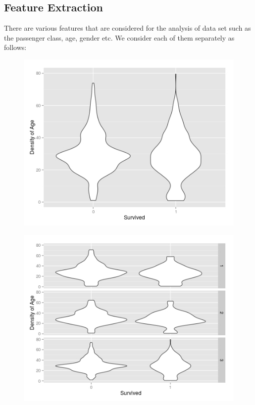 \subsection{Feature Extraction}
There are various features that are considered for the analysis of data set such as the passenger class, age, gender etc. We consider each of them separately as follows:

\begin{figure}
\centering
\begin{minipage}{.5\textwidth}
  \centering
  \includegraphics[width=1\linewidth]{figs/plot11}
  \label{fig:plot11}
\end{minipage}%
\begin{minipage}{.5\textwidth}
  \centering
  \includegraphics[width=1\linewidth]{figs/plot13}
  \label{fig:plot13}
\end{minipage}
\end{figure}

